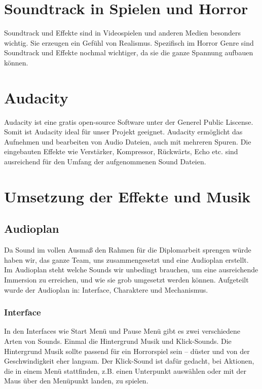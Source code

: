 \section{Soundtrack in Spielen und Horror}
\label{sound:main}
Soundtrack und Effekte sind in Videospielen und anderen Medien besonders wichtig.
Sie erzeugen ein Gefühl von Realismus. Spezifisch im Horror Genre sind Soundtrack und Effekte nochmal wichtiger, da sie die ganze Spannung aufbauen können.

\section{Audacity}
Audacity ist eine gratis open-source Software unter der Generel Public Liscense.
Somit ist Audacity ideal für unser Projekt geeignet. Audacity ermöglicht das Aufnehmen und bearbeiten von Audio Dateien, auch mit mehreren Spuren.
Die eingebauten Effekte wie Verstärker, Kompressor, Rückwärts, Echo etc. sind ausreichend für den Umfang der aufgenommenen Sound Dateien.

\section{Umsetzung der Effekte und Musik}
\subsection{Audioplan}
Da Sound im vollen Ausmaß den Rahmen für die Diplomarbeit sprengen würde haben wir, das ganze Team, uns zusammengesetzt und eine
Audioplan erstellt. Im Audioplan steht welche Sounds wir unbedingt brauchen,
um eine ausreichende Immersion zu erreichen, und wie sie grob umgesetzt werden können. Aufgeteilt wurde der Audioplan in: Interface, Charaktere und Mechanismus.

\subsubsection{Interface}
In den Interfaces wie Start Menü und Pause Menü gibt es zwei verschiedene Arten von Sounds. Einmal die Hintergrund Musik und Klick-Sounds.
Die Hintergrund Musik sollte passend für ein Horrorspiel sein – düster und von der Geschwindigkeit eher langsam.
Der Klick-Sound ist dafür gedacht, bei Aktionen, die in einem Menü stattfinden, z.B. einen Unterpunkt auswählen oder mit der Maus über den Menüpunkt landen, zu spielen.

